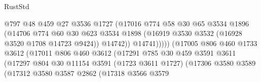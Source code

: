 \begin{lexlean}{RustStd}
\begin{coremodule}
                                          @797
                                          @48
                                          @459
                                          @27
                                          @3536
                                          @1727
                                          (@17016
                                            @774
                                            @58
                                            @30
                                            @65
                                            @3534
                                            @1896
                                            (@14706
                                              @774
                                              @60
                                              @30
                                              @623
                                              @3534
                                              @1898
                                              (@16919 @3530 @3532 (@16928 @3520 @1708 @14723 @9424))
                                              @14742))
                                          @14741)))))
                                (@17005
                                  @806
                                  @460
                                  @1733
                                  @3612
                                  (@17011
                                    @806
                                    @460
                                    @3612
                                    (@17291
                                      @785
                                      @30
                                      @459
                                      @3591
                                      @3611
                                      (@17297
                                        @804
                                        @30
                                        @11154
                                        @3591
                                        (@1723 @3611 @1727)
                                        (@17306
                                          @3580
                                          @3589
                                          (@17312
                                            @3580
                                            @3587
                                            @2862
                                            (@17318
                                              @3566
                                              @3579

\end{coremodule}
\end{lexlean}
